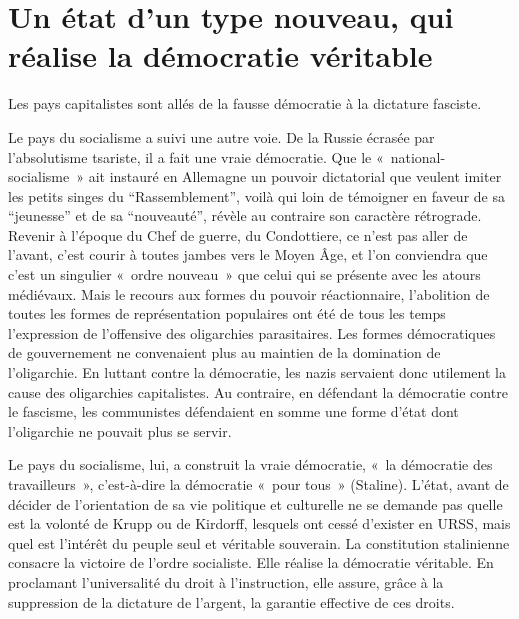 \documentclass[french,twoside]{book} %
\begin{document}
\section[{Un état d’un type nouveau, qui réalise la démocratie véritable}]{Un état d’un type nouveau, qui réalise la démocratie véritable}
\noindent Les pays capitalistes sont allés de la fausse démocratie à la dictature fasciste.\par
Le pays du socialisme a suivi une autre voie. De la Russie écrasée par l’absolutisme tsariste, il a fait une vraie démocratie. Que le « national-socialisme » ait instauré en Allemagne un pouvoir dictatorial que veulent imiter les petits singes du “Rassemblement”, voilà qui loin de témoigner en faveur de sa “jeunesse” et de sa “nouveauté”, révèle au contraire son caractère rétrograde. Revenir à l’époque du Chef de guerre, du Condottiere, ce n’est pas aller de l’avant, c’est courir à toutes jambes vers le Moyen Âge, et l’on conviendra que c’est un singulier « ordre nouveau » que celui qui se présente avec les atours médiévaux. Mais le recours aux formes du pouvoir réactionnaire, l’abolition de toutes les formes de représentation populaires ont été de tous les temps l’expression de l’offensive des oligarchies parasitaires. Les formes démocratiques de gouvernement ne convenaient plus au maintien de la domination de l’oligarchie. En luttant contre la démocratie, les nazis servaient donc utilement la cause des oligarchies capitalistes. Au contraire, en défendant la démocratie contre le fascisme, les communistes défendaient en somme une forme d’état dont l’oligarchie ne pouvait plus se servir.\par
Le pays du socialisme, lui, a construit la vraie démocratie, « la démocratie des travailleurs », c’est-à-dire la démocratie « pour tous » (Staline). L’état, avant de décider de l’orientation de sa vie politique et culturelle ne se demande pas quelle est la volonté de Krupp ou de Kirdorff, lesquels ont cessé d’exister en URSS, mais quel est l’intérêt du peuple seul et véritable souverain. La constitution stalinienne consacre la victoire de l’ordre socialiste. Elle réalise la démocratie véritable. En proclamant l’universalité du droit à l’instruction, elle assure, grâce à la suppression de la dictature de l’argent, la garantie effective de ces droits.
\end{document}
